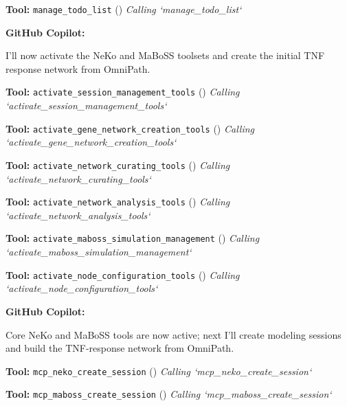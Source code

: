 \documentclass[11pt,a4paper]{article}
\begin{document}
\begin{toolokbox}
\textbf{Tool:} \texttt{manage\_todo\_list} (\checkmark)
\textit{Calling `manage\_todo\_list`}
\end{toolokbox}
\begin{copilotbox}
\textbf{GitHub Copilot:}

I'll now activate the NeKo and MaBoSS toolsets and create the initial TNF response network from OmniPath.

\end{copilotbox}
\begin{toolokbox}
\textbf{Tool:} \texttt{activate\_session\_management\_tools} (\checkmark)
\textit{Calling `activate\_session\_management\_tools`}
\end{toolokbox}
\begin{toolokbox}
\textbf{Tool:} \texttt{activate\_gene\_network\_creation\_tools} (\checkmark)
\textit{Calling `activate\_gene\_network\_creation\_tools`}
\end{toolokbox}
\begin{toolokbox}
\textbf{Tool:} \texttt{activate\_network\_curating\_tools} (\checkmark)
\textit{Calling `activate\_network\_curating\_tools`}
\end{toolokbox}
\begin{toolokbox}
\textbf{Tool:} \texttt{activate\_network\_analysis\_tools} (\checkmark)
\textit{Calling `activate\_network\_analysis\_tools`}
\end{toolokbox}
\begin{toolokbox}
\textbf{Tool:} \texttt{activate\_maboss\_simulation\_management} (\checkmark)
\textit{Calling `activate\_maboss\_simulation\_management`}
\end{toolokbox}
\begin{toolokbox}
\textbf{Tool:} \texttt{activate\_node\_configuration\_tools} (\checkmark)
\textit{Calling `activate\_node\_configuration\_tools`}
\end{toolokbox}
\begin{copilotbox}
\textbf{GitHub Copilot:}

Core NeKo and MaBoSS tools are now active; next I’ll create modeling sessions and build the TNF-response network from OmniPath.

\end{copilotbox}
\begin{toolokbox}
\textbf{Tool:} \texttt{mcp\_neko\_create\_session} (\checkmark)
\textit{Calling `mcp\_neko\_create\_session`}
\end{toolokbox}
\begin{toolokbox}
\textbf{Tool:} \texttt{mcp\_maboss\_create\_session} (\checkmark)
\textit{Calling `mcp\_maboss\_create\_session`}
\end{toolokbox}
\end{document}
